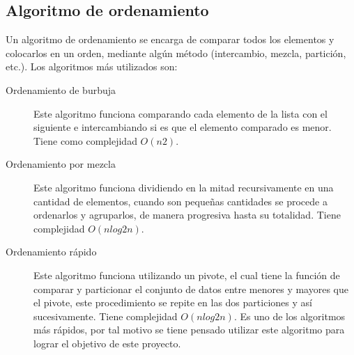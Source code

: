 \documentclass[9pt,draft,a4paper,twoside,onecolumn,romanappendices]{IEEEtran}\usepackage[]{graphicx}\usepackage[]{color}
\theoremstyle{definition}
\begin{document}
\subsection{Algoritmo de ordenamiento}

Un algoritmo de ordenamiento se encarga de comparar todos los elementos y colocarlos en un orden, mediante algún método (intercambio, mezcla, partición, etc.). Los algoritmos más utilizados son: %

\begin{description}
\item[Ordenamiento de burbuja] Este algoritmo funciona comparando cada elemento de la lista con el siguiente e intercambiando si es que el elemento comparado es menor. Tiene como complejidad $O(n2)$.

\item[Ordenamiento por mezcla] Este algoritmo funciona dividiendo en la mitad recursivamente en una cantidad de elementos, cuando son pequeñas cantidades se procede a ordenarlos y agruparlos, de manera progresiva hasta su totalidad. Tiene complejidad $O(nlog2n)$.

\item[Ordenamiento rápido] Este algoritmo funciona utilizando un pivote, el cual tiene la función de comparar y particionar el conjunto de datos entre menores y mayores que el pivote, este procedimiento se repite en las dos particiones y así sucesivamente. Tiene complejidad $O(nlog2n)$. Es uno de los algoritmos más rápidos, por tal motivo se tiene pensado utilizar este algoritmo para lograr el objetivo de este proyecto.
\end{description}
\end{document}
